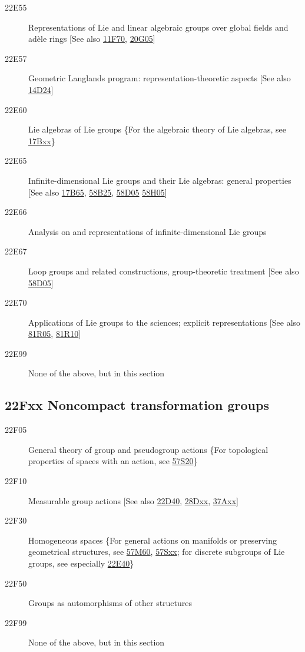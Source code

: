 \documentclass[letterpaper]{article}
\begin{document}
\begin{description}
\item [22E55]\label{22E55} Representations of Lie and linear algebraic groups over global fields and ad\`{e}le rings [See also \hyperref[11F70]{11F70}, \hyperref[20G05]{20G05}]
\item [22E57]\label{22E57} Geometric Langlands program: representation-theoretic aspects [See also \hyperref[14D24]{14D24}]
\item [22E60]\label{22E60} Lie algebras of Lie groups \{For the algebraic theory of Lie algebras, see \hyperref[17Bxx]{17Bxx}\}
\item [22E65]\label{22E65} Infinite-dimensional Lie groups and their Lie algebras: general properties [See also \hyperref[17B65]{17B65}, \hyperref[58B25]{58B25}, \hyperref[58D05]{58D05} \hyperref[58H05]{58H05}]
\item [22E66]\label{22E66} Analysis on and representations of infinite-dimensional Lie groups
\item [22E67]\label{22E67} Loop groups and related constructions, group-theoretic treatment [See also \hyperref[58D05]{58D05}]
\item [22E70]\label{22E70} Applications of Lie groups to the sciences; explicit representations [See also \hyperref[81R05]{81R05}, \hyperref[81R10]{81R10}]
\item [22E99]\label{22E99} None of the above, but in this section
\end{description}
\subsection*{22Fxx  Noncompact transformation groups }\label{22Fxx}
\begin{description} 
\item [22F05]\label{22F05} General theory of group and pseudogroup actions \{For topological properties of spaces with an action, see \hyperref[57S20]{57S20}\}
\item [22F10]\label{22F10} Measurable group actions [See also \hyperref[22D40]{22D40}, \hyperref[28Dxx]{28Dxx}, \hyperref[37Axx]{37Axx}]
\item [22F30]\label{22F30} Homogeneous spaces \{For general actions on manifolds or preserving geometrical structures, see \hyperref[57M60]{57M60}, \hyperref[57Sxx]{57Sxx}; for discrete subgroups of Lie groups, see especially  \hyperref[22E40]{22E40}\}
\item [22F50]\label{22F50} Groups as automorphisms of other structures
\item [22F99]\label{22F99} None of the above, but in this section
\end{description}
\end{document}
